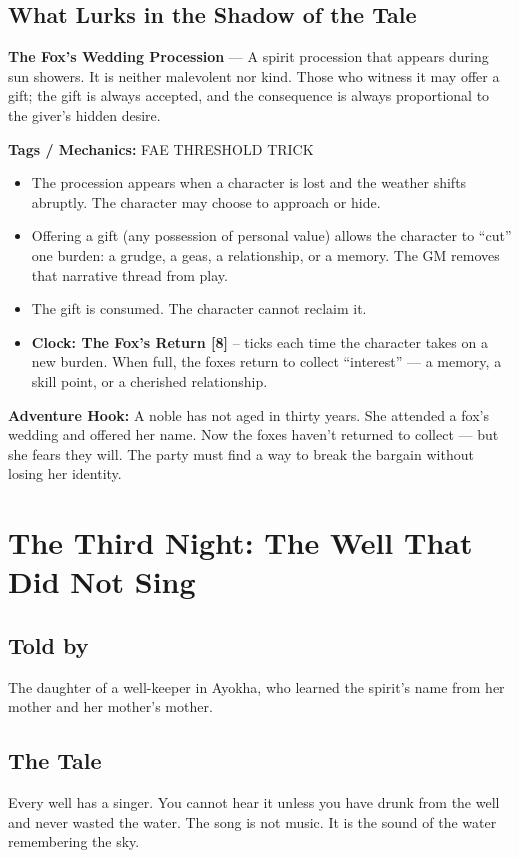 \documentclass[10pt,twoside]{book}
\newcommand{\tag}[1]{\textsc{#1}}
\begin{document}
\section*{What Lurks in the Shadow of the Tale}
\begin{infobox}
\textbf{The Fox's Wedding Procession} --- A spirit procession that appears during sun showers. It is neither malevolent nor kind. Those who witness it may offer a gift; the gift is always accepted, and the consequence is always proportional to the giver's hidden desire.

\textbf{Tags / Mechanics:} \tag{FAE} \tag{THRESHOLD} \tag{TRICK}

\begin{itemize}
\item The procession appears when a character is lost and the weather shifts abruptly. The character may choose to approach or hide.
\item Offering a gift (any possession of personal value) allows the character to ``cut'' one burden: a grudge, a geas, a relationship, or a memory. The GM removes that narrative thread from play.
\item The gift is consumed. The character cannot reclaim it.
\item \textbf{Clock: The Fox's Return [8]} -- ticks each time the character takes on a new burden. When full, the foxes return to collect ``interest'' --- a memory, a skill point, or a cherished relationship.
\end{itemize}

\textbf{Adventure Hook:} A noble has not aged in thirty years. She attended a fox's wedding and offered her name. Now the foxes haven't returned to collect --- but she fears they will. The party must find a way to break the bargain without losing her identity.
\end{infobox}

\chapter{The Third Night: The Well That Did Not Sing}

\section*{Told by}
The daughter of a well-keeper in Ayokha, who learned the spirit's name from her mother and her mother's mother.

\section*{The Tale}
Every well has a singer. You cannot hear it unless you have drunk from the well and never wasted the water. The song is not music. It is the sound of the water remembering the sky.
\end{document}
